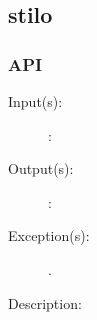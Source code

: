 %
%
%
%
%              

\subsection{stilo}
\label{stilo}

\subsubsection{API}
\begin{description}
\label{stilo_}
\item[{\cfunc[]{stilo\_}{}}: ]
	\begin{description}\item[]
	\item[Input(s): ]
		\begin{description}\item[]
		\item[: ]
		\end{description}
	\item[Output(s): ]
		\begin{description}\item[]
		\item[: ]
		\end{description}
	\item[Exception(s): ]
		\begin{description}\item[]
		\item[.]
		\end{description}
	\item[Description: ]
	\end{description}
\end{description}
